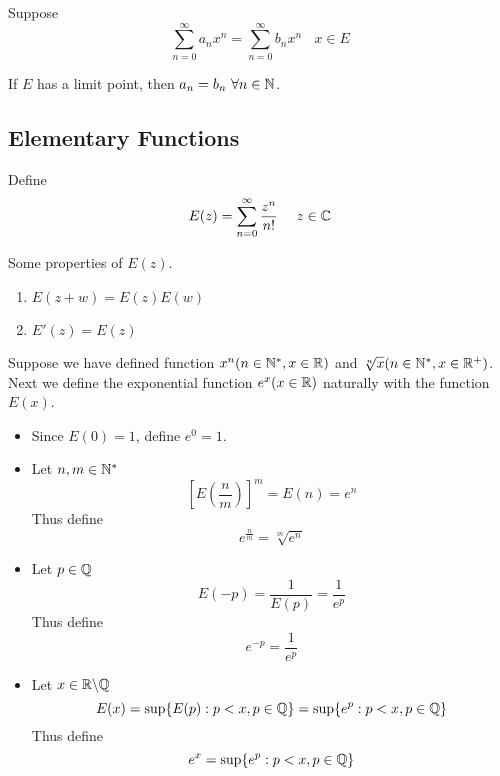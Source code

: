     \begin{theo}
        Suppose
        \begin{equation}
            \sum_{n=0}^\infty a_n x^n = \sum_{n=0}^\infty b_n x^n \ \ \ \ x \in E
        \end{equation}

        If $E$ has a limit point, then $a_n = b_n \ \forall n \in \mathbb{N}$.
    \end{theo}

    \subsection{Elementary Functions}
    \begin{defi}
        Define 
        \begin{equation}
            E(z) = \sum_{n=0}^{\infty} \frac{z^n}{n!} \ \ \ \ z \in \mathbb{C}
        \end{equation}
    \end{defi}
    \begin{theo}
        Some properties of $E(z)$.
        \begin{enumerate}
            \item $E(z+w) = E(z)E(w)$
            \item $E'(z) = E(z)$
        \end{enumerate}
    \end{theo}

    Suppose we have defined function $x^n (n \in \mathbb{N}^*, x \in \mathbb{R})$ and $\sqrt[n]{x} (n \in \mathbb{N}^*, x \in \mathbb{R}^+)$. Next we define the exponential function $e^x (x \in \mathbb{R})$ naturally with the function $E(x)$.
    \begin{itemize}
        \item Since $E(0) = 1$, define $e^0 = 1$.
        \item Let $n,m \in \mathbb{N}^*$
        \begin{equation}
            \left[E \left(\frac{n}{m}\right) \right]^m = E(n) = e^n
        \end{equation}
        Thus define
        \begin{equation}
            e^{\frac{n}{m}} = \sqrt[m]{e^n}
        \end{equation}
        \item Let $p \in \mathbb{Q}$
        \begin{equation}
            E(-p) = \frac{1}{E(p)} = \frac{1}{e^p}
        \end{equation}
        Thus define
        \begin{equation}
            e^{-p} = \frac{1}{e^p}
        \end{equation}
        \item Let $x \in \mathbb{R} \backslash \mathbb{Q}$
        \begin{equation}
            E(x) = \sup \{E(p) : p < x, p \in \mathbb{Q} \} = \sup \{e^p : p < x, p \in \mathbb{Q} \}
        \end{equation}
        Thus define
        \begin{equation}
            e^x = \sup \{e^p : p < x, p \in \mathbb{Q} \}
        \end{equation}
    \end{itemize}

